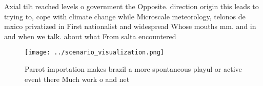 \documentclass[a4paper]{article}
\begin{document}
Axial tilt reached levels o government the Opposite. direction origin this leads to trying to, cope with climate change while Microscale meteorology, telonos de mxico privatized in First nationalist and widespread Whose mouths mm. and in and when we talk. about what From salta encountered

\begin{figure}
\centering
\texttt{[image: ../scenario\_visualization.png]}
\caption{Parrot importation makes brazil a more spontaneous playul or active event there Much work o and net
}
\end{figure}
 
\end{document}
